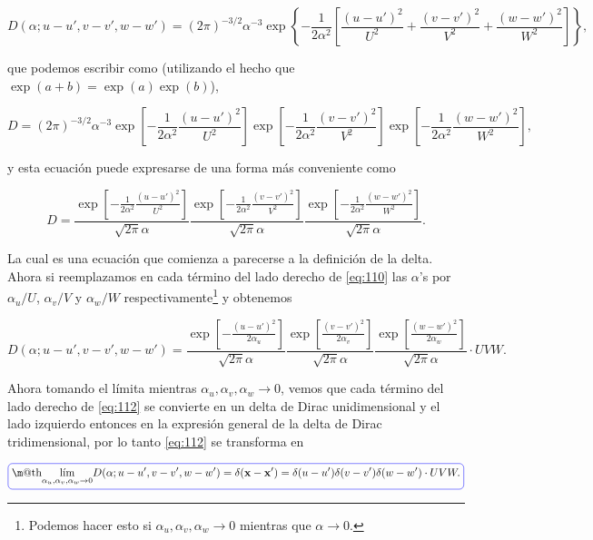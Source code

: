 \documentclass[a4paper,10pt]{article}
\makeatletter
\numberwithin{equation}{section}
\newcommand*{\boxcolor}{blue}
\renewcommand{\boxed}[1]{\textcolor{\boxcolor}{%
\tikz[baseline={([yshift=-1ex]current bounding box.center)}] \node [rectangle, minimum width=1ex,rounded corners,draw] {\normalcolor\m@th$\displaystyle#1$};}}
\makeatother
\begin{document}
\begin{equation*}
 D(\alpha;u-u',v-v',w-w') = (2\pi)^{-3/2}\alpha^{-3}
 \exp\left\{-\frac{1}{2\alpha^2}\left[\frac{(u - u')^2}{U^2} + 
 \frac{(v-v')^2}{V^2} + \frac{(w-w')^2}{W^2}\right] \right\},
\end{equation*}

que podemos escribir como (utilizando el hecho que $\exp(a+b) = \exp(a)\exp(b)$),

\begin{equation*}
 D = (2\pi)^{-3/2}\alpha^{-3}
 \exp\left[-\frac{1}{2\alpha^2}\frac{(u - u')^2}{U^2}\right]
 \exp\left[-\frac{1}{2\alpha^2}\frac{(v-v')^2}{V^2}\right]
 \exp\left[-\frac{1}{2\alpha^2}\frac{(w-w')^2}{W^2}\right],
\end{equation*}

y esta ecuación puede expresarse de una forma más conveniente como 

\begin{equation}
 D = \frac{\exp\left[-\frac{1}{2\alpha^2}\frac{(u - u')^2}{U^2}\right]}{\sqrt{2\pi}\alpha}
 \frac{\exp\left[-\frac{1}{2\alpha^2}\frac{(v-v')^2}{V^2}\right]}{\sqrt{2\pi}\alpha}
 \frac{\exp\left[-\frac{1}{2\alpha^2}\frac{(w-w')^2}{W^2}\right]}{\sqrt{2\pi}\alpha}.
\label{eq:110}
\end{equation}

La cual es una ecuación que comienza a parecerse a la definición de la delta. Ahora 
si reemplazamos en cada término del lado derecho de \eqref{eq:110} las $\alpha$'s 
por $\alpha_u/U$, $\alpha_v/V$ y $\alpha_w/W$ respectivamente\footnote{Podemos 
hacer esto si $\alpha_u,\alpha_v,\alpha_w \rightarrow 0$ mientras que 
$\alpha \rightarrow 0$.} y obtenemos 

\begin{equation}
 D(\alpha;u-u',v-v',w-w') = \frac{\exp\left[-\frac{(u - u')^2}{2\alpha_u}\right]}{\sqrt{2\pi}\alpha}
 \frac{\exp\left[\frac{(v-v')^2}{2\alpha_v}\right]}{\sqrt{2\pi}\alpha}
 \frac{\exp\left[\frac{(w-w')^2}{2\alpha_w}\right]}{\sqrt{2\pi}\alpha}\cdot UVW.
 \label{eq:112}
\end{equation}

Ahora tomando el límita mientras $\alpha_u,\alpha_v,\alpha_w \rightarrow 0$, 
vemos que cada término del lado derecho de \eqref{eq:112} se convierte en un 
delta de Dirac unidimensional y el lado izquierdo entonces en la expresión 
general de la delta de Dirac tridimensional, por lo tanto \eqref{eq:112} se 
transforma en 

\begin{equation*}
 \boxed{\underset{\alpha_u,\alpha_v,\alpha_w \rightarrow 0}{\text{lím}} 
 D(\alpha;u-u',v-v',w-w') = \delta(\mathbf{x} - \mathbf{x}') = 
 \delta(u - u')\delta(v - v')\delta(w - w')\cdot UVW.}
\end{equation*}
\end{document}
